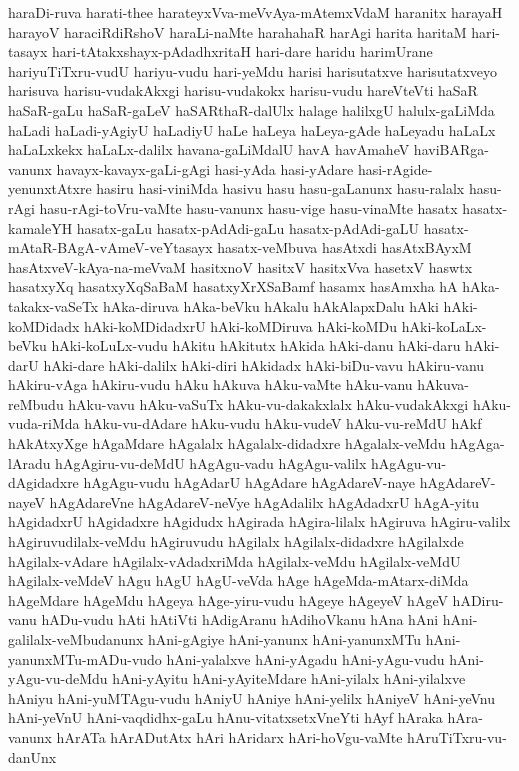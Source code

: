 {haraDi-ruva
harati-thee
harateyxVva-meVvAya-mAtemxVdaM
haranitx
harayaH
harayoV
haraciRdiRshoV
haraLi-naMte
harahahaR
harAgi
harita
haritaM
hari-tasayx
hari-tAtakxshayx-pAdadhxritaH
hari-dare
haridu
harimUrane
hariyuTiTxru-vudU
hariyu-vudu
hari-yeMdu
harisi
harisutatxve
harisutatxveyo
harisuva
harisu-vudakAkxgi
harisu-vudakokx
harisu-vudu
hareVteVti
haSaR
haSaR-gaLu
haSaR-gaLeV
haSARthaR-dalUlx
halage
halilxgU
halulx-gaLiMda
haLadi
haLadi-yAgiyU
haLadiyU
haLe
haLeya
haLeya-gAde
haLeyadu
haLaLx
haLaLxkekx
haLaLx-dalilx
havana-gaLiMdalU
havA
havAmaheV
haviBARga-vanunx
havayx-kavayx-gaLi-gAgi
hasi-yAda
hasi-yAdare
hasi-rAgide-yenunxtAtxre
hasiru
hasi-viniMda
hasivu
hasu
hasu-gaLanunx
hasu-ralalx
hasu-rAgi
hasu-rAgi-toVru-vaMte
hasu-vanunx
hasu-vige
hasu-vinaMte
hasatx
hasatx-kamaleYH
hasatx-gaLu
hasatx-pAdAdi-gaLu
hasatx-pAdAdi-gaLU
hasatx-mAtaR-BAgA-vAmeV-veYtasayx
hasatx-veMbuva
hasAtxdi
hasAtxBAyxM
hasAtxveV-kAya-na-meVvaM
hasitxnoV
hasitxV
hasitxVva
hasetxV
haswtx
hasatxyXq
hasatxyXqSaBaM
hasatxyXrXSaBamf
hasamx
hasAmxha
hA
hAka-takakx-vaSeTx
hAka-diruva
hAka-beVku
hAkalu
hAkAlapxDalu
hAki
hAki-koMDidadx
hAki-koMDidadxrU
hAki-koMDiruva
hAki-koMDu
hAki-koLaLx-beVku
hAki-koLuLx-vudu
hAkitu
hAkitutx
hAkida
hAki-danu
hAki-daru
hAki-darU
hAki-dare
hAki-dalilx
hAki-diri
hAkidadx
hAki-biDu-vavu
hAkiru-vanu
hAkiru-vAga
hAkiru-vudu
hAku
hAkuva
hAku-vaMte
hAku-vanu
hAkuva-reMbudu
hAku-vavu
hAku-vaSuTx
hAku-vu-dakakxlalx
hAku-vudakAkxgi
hAku-vuda-riMda
hAku-vu-dAdare
hAku-vudu
hAku-vudeV
hAku-vu-reMdU
hAkf
hAkAtxyXge
hAgaMdare
hAgalalx
hAgalalx-didadxre
hAgalalx-veMdu
hAgAga-lAradu
hAgAgiru-vu-deMdU
hAgAgu-vadu
hAgAgu-valilx
hAgAgu-vu-dAgidadxre
hAgAgu-vudu
hAgAdarU
hAgAdare
hAgAdareV-naye
hAgAdareV-nayeV
hAgAdareVne
hAgAdareV-neVye
hAgAdalilx
hAgAdadxrU
hAgA-yitu
hAgidadxrU
hAgidadxre
hAgidudx
hAgirada
hAgira-lilalx
hAgiruva
hAgiru-valilx
hAgiruvudilalx-veMdu
hAgiruvudu
hAgilalx
hAgilalx-didadxre
hAgilalxde
hAgilalx-vAdare
hAgilalx-vAdadxriMda
hAgilalx-veMdu
hAgilalx-veMdU
hAgilalx-veMdeV
hAgu
hAgU
hAgU-veVda
hAge
hAgeMda-mAtarx-diMda
hAgeMdare
hAgeMdu
hAgeya
hAge-yiru-vudu
hAgeye
hAgeyeV
hAgeV
hADiru-vanu
hADu-vudu
hAti
hAtiVti
hAdigAranu
hAdihoVkanu
hAna
hAni
hAni-galilalx-veMbudanunx
hAni-gAgiye
hAni-yanunx
hAni-yanunxMTu
hAni-yanunxMTu-mADu-vudo
hAni-yalalxve
hAni-yAgadu
hAni-yAgu-vudu
hAni-yAgu-vu-deMdu
hAni-yAyitu
hAni-yAyiteMdare
hAni-yilalx
hAni-yilalxve
hAniyu
hAni-yuMTAgu-vudu
hAniyU
hAniye
hAni-yelilx
hAniyeV
hAni-yeVnu
hAni-yeVnU
hAni-vaqdidhx-gaLu
hAnu-vitatxsetxVneYti
hAyf
hAraka
hAra-vanunx
hArATa
hArADutAtx
hAri
hAridarx
hAri-hoVgu-vaMte
hAruTiTxru-vu-danUnx
}
